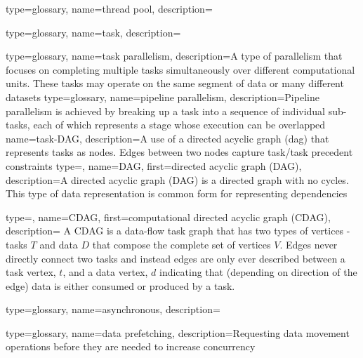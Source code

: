 {
  type=glossary,
  name={thread pool},
  description={}
}

{
  type=glossary,
  name={task},
  description={}
}

{
  type=glossary,
  name={task parallelism},
  description={A type of parallelism that focuses on completing multiple tasks simultaneously over different computational units. These tasks may operate on the same segment of data or many different datasets}
}
{
  type=glossary,
  name={pipeline parallelism},
  description={Pipeline parallelism is achieved by breaking up a task into a sequence of
individual sub-tasks, each of which represents a stage whose execution can be
  overlapped}
}
{
  name={task-DAG},
  description={A use of a directed acyclic graph (\gls{dag}) that represents
    tasks as nodes. Edges between two nodes capture task/task precedent
      constraints}
}
{
  type=\acronymtype,
  name={DAG},
  first={directed acyclic graph (DAG)},
  description={A directed acyclic graph (DAG) is a directed graph with no cycles. This type of data representation is common form for representing dependencies}
}

{
  type=\acronymtype,
  name={CDAG},
  first={computational directed acyclic graph (CDAG)},
  description={ A CDAG is a data-flow task graph that has two
types of vertices - tasks $T$ and data $D$ that compose the complete set of vertices $V$.
Edges never directly connect two tasks and instead edges are only ever described between a task vertex, $t$, and a data vertex, $d$
indicating that (depending on direction of the edge) data is either consumed or produced by a task.
}
}

{
  type=glossary,
  name=asynchronous,
  description={}
}

{
  type=glossary,
  name={data prefetching},
  description={Requesting data movement operations before they are needed to
    increase \gls{concurrency}}
}

